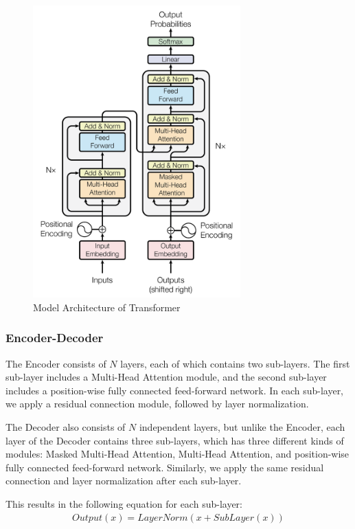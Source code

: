 \documentclass[conference]{IEEEtran}
\begin{document}
\begin{figure}[htbp]
    \centerline{\includegraphics[width = 8cm]{pic/fig1.png}}
    \caption{Model Architecture of Transformer}
    \label{fig}
\end{figure}

\subsubsection{Encoder-Decoder}

\par The Encoder consists of $N$ layers, each of which contains two sub-layers. 
The first sub-layer includes a Multi-Head Attention module, and the 
second sub-layer includes a position-wise fully connected feed-forward network. 
In each sub-layer, we apply a residual connection module, followed by layer normalization.

\par The Decoder also consists of $N$ independent layers, but unlike the Encoder, 
each layer of the Decoder contains three sub-layers, which has three different kinds of modules: 
Masked Multi-Head Attention, Multi-Head Attention, and position-wise fully connected 
feed-forward network. Similarly, we apply the same residual connection and layer 
normalization after each sub-layer.

\par This results in the following equation for each sub-layer:
\begin{align*}
    Output(x) = LayerNorm(x + SubLayer(x))
\end{align*}
\end{document}
